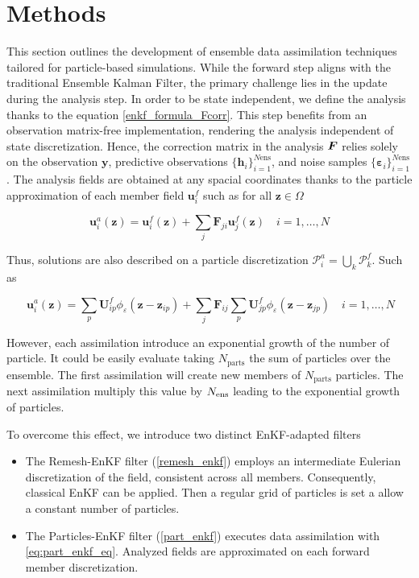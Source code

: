 
\section{Methods}\label{Methods}

This section outlines the development of ensemble data assimilation techniques tailored for particle-based simulations. While the forward step aligns with the traditional Ensemble Kalman Filter, the primary challenge lies in the update during the analysis step. In order to be state independent, we define the analysis thanks to the equation \eqref{enkf_formula_Fcorr}. This step benefits from an observation matrix-free implementation, rendering the analysis independent of state discretization. Hence, the correction matrix in the analysis $\bm{F}$ relies solely on the observation $\bm{y}$, predictive observations $\{\bm h_i\}_{i=1}^{N{\text{ens}}}$, and noise samples $\{\bm \varepsilon_i\}_{i=1}^{N{\text{ens}}}$. The analysis fields are obtained at any spacial coordinates thanks to the particle approximation of each member field $\bm u^f_i$ such as for all $\bm z \in \Omega$

\begin{equation*}
    \bm u^a_i(\bm z) = \bm u^f_i(\bm z) + \sum_{j} \bm F_{ji} \bm u^f_j(\bm z) \quad i = 1,\dots, N
\end{equation*}

Thus, solutions are also described on a particle discretization $\mathcal{P}^a_i = \bigcup_k \mathcal{P}_k^f$. Such as

\begin{equation}~\label{eq:part_enkf_eq}
    \bm u^a_i(\bm z) = \sum_p \bm U^f_{ip} \phi_{\varepsilon}(\bm z - \bm z_{ip}) + \sum_{j} \bm F_{ij} \sum_p \bm U^f_{jp} \phi_{\varepsilon}(\bm z- \bm z_{jp}) \quad i = 1,\dots, N
\end{equation}

However, each assimilation introduce an exponential growth of the number of particle. It could be easily evaluate taking $N_{\text{parts}}$ the sum of particles over the ensemble. The first assimilation will create new members of $N_{\text{parts}}$ particles. The next assimilation multiply this value by $N_{\text{ens}}$ leading to the exponential growth of particles.

To overcome this effect, we introduce two distinct EnKF-adapted filters

\begin{itemize}
    \item The Remesh-EnKF filter (\ref{remesh_enkf}) employs an intermediate Eulerian discretization of the field, consistent across all members. Consequently, classical EnKF can be applied. Then a regular grid of particles is set a allow a constant number of particles.
    \item The Particles-EnKF filter (\ref{part_enkf}) executes data assimilation with \eqref{eq:part_enkf_eq}. Analyzed fields are approximated on each forward member discretization.
\end{itemize}

